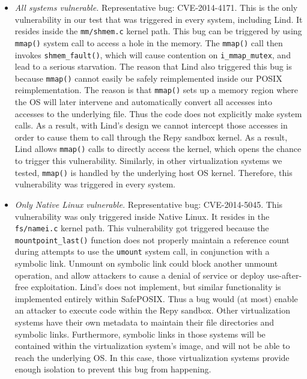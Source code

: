 \begin{itemize}
\item \emph{All systems vulnerable.}  Representative bug: CVE-2014-4171. 
This is the only vulnerability in our test that was triggered in every 
system, including Lind. It resides inside the \texttt{mm/shmem.c} kernel path. This bug can 
be triggered by using \texttt{mmap()} system call to access a hole in the memory. 
The \texttt{mmap()} call then invokes \texttt{shmem\_fault()}, which will cause contention 
on \texttt{i\_mmap\_mutex}, and lead to a serious starvation.  
The reason that Lind also triggered this bug is because \texttt{mmap()} cannot easily 
be safely reimplemented inside our POSIX reimplementation.  The reason is
that \texttt{mmap()} sets up a memory region where the OS will later 
intervene and automatically convert all accesses into accesses to the
underlying file.  Thus the code does not explicitly make system calls.  As
a result, with Lind's design we cannot intercept those accesses in order
to cause them to call through the Repy sandbox kernel. As a result, 
Lind allows \texttt{mmap()} calls to directly access the kernel, which 
opens the chance to trigger this vulnerability. Similarly, in other 
virtualization systems we tested, \texttt{mmap()} is handled by the underlying
host OS kernel.  
Therefore, this vulnerability was 
triggered in every system. 

\item \emph{Only Native Linux vulnerable.}  Representative bug: CVE-2014-5045. 
This vulnerability was only triggered inside Native Linux. It resides in the 
\texttt{fs/namei.c} kernel path. This vulnerability got triggered because 
the \texttt{mountpoint\_last()}
function does not properly 
maintain a reference count during attempts to use the \texttt{umount} system call, 
in conjunction with a symbolic link. Unmount on symbolic link could block another unmount operation, 
and allow attackers to cause a denial of service or deploy use-after-free exploitation. 
Lind's  does not implement, but similar functionality is implemented entirely 
within SafePOSIX.  Thus a bug would (at most) enable an attacker to execute
code within the Repy sandbox.
Other virtualization systems have their own metadata to maintain their file directories and symbolic links. 
Furthermore, symbolic links in those systems will be contained within the virtualization system's image, 
and will not be able to reach the underlying OS. In this case, those virtualization systems provide enough 
isolation to prevent this bug from happening. 


\end{itemize}
